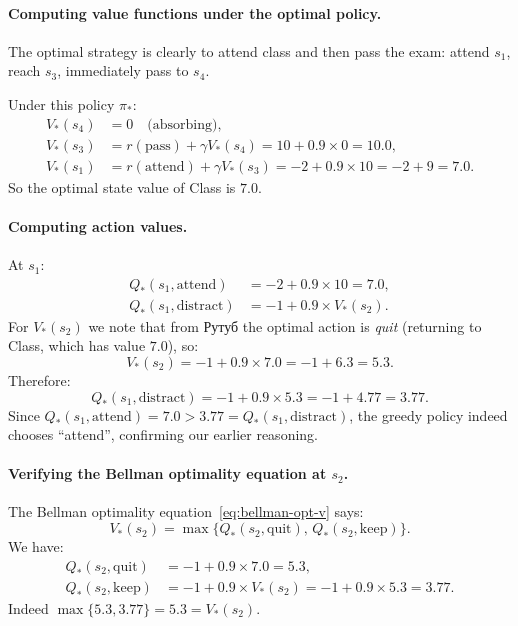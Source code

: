 \begin{example}
\paragraph{Computing value functions under the optimal policy.}
The optimal strategy is clearly to attend class and then pass the exam: attend $s_1$, reach $s_3$, immediately pass to $s_4$.

Under this policy $\pi_*$:
\begin{align*}
V_*(s_4) &= 0 \quad \text{(absorbing)}, \\
V_*(s_3) &= r(\text{pass}) + \gamma V_*(s_4) = 10 + 0.9 \times 0 = 10.0, \\
V_*(s_1) &= r(\text{attend}) + \gamma V_*(s_3) = -2 + 0.9 \times 10 = -2 + 9 = 7.0.
\end{align*}
So the optimal state value of Class is $7.0$.

\paragraph{Computing action values.}
At $s_1$:
\begin{align*}
Q_*(s_1, \text{attend})   &= -2 + 0.9 \times 10 = 7.0, \\
Q_*(s_1, \text{distract}) &= -1 + 0.9 \times V_*(s_2).
\end{align*}
For $V_*(s_2)$ we note that from Рутуб the optimal action is \emph{quit} (returning to Class, which has value $7.0$), so:
\[
V_*(s_2) = -1 + 0.9 \times 7.0 = -1 + 6.3 = 5.3.
\]
Therefore:
\[
Q_*(s_1, \text{distract}) = -1 + 0.9 \times 5.3 = -1 + 4.77 = 3.77.
\]
Since $Q_*(s_1, \text{attend}) = 7.0 > 3.77 = Q_*(s_1, \text{distract})$, the greedy policy indeed chooses ``attend'', confirming our earlier reasoning.

\paragraph{Verifying the Bellman optimality equation at $s_2$.}
The Bellman optimality equation~\eqref{eq:bellman-opt-v} says:
\[
V_*(s_2)
= \max\bigl\{Q_*(s_2, \text{quit}),\, Q_*(s_2, \text{keep})\bigr\}.
\]
We have:
\begin{align*}
Q_*(s_2, \text{quit}) &= -1 + 0.9 \times 7.0 = 5.3, \\
Q_*(s_2, \text{keep}) &= -1 + 0.9 \times V_*(s_2) = -1 + 0.9 \times 5.3 = 3.77.
\end{align*}
Indeed $\max\{5.3, 3.77\} = 5.3 = V_*(s_2)$. \checkmark
\end{example}


